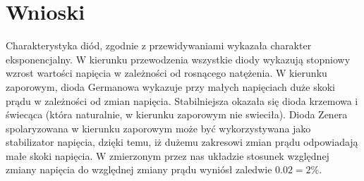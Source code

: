 \documentclass[11pt]{article}
\begin{document}
\section{Wnioski}
Charakterystyka diód, zgodnie z przewidywaniami wykazała charakter eksponencjalny. W kierunku przewodzenia wszystkie diody wykazują stopniowy wzrost wartości napięcia w zależności od rosnącego natężenia. W kierunku zaporowym, dioda Germanowa wykazuje przy małych napięciach duże skoki prądu w zależności od zmian napięcia. Stabilniejsza okazała się dioda krzemowa i świecąca (która naturalnie, w kierunku zaporowym nie swieciła).
Dioda Zenera spolaryzowana w kierunku zaporowym może być wykorzystywana jako stabilizator napięcia, dzięki temu, iż dużemu zakresowi zmian prądu odpowiadają małe skoki napięcia. W zmierzonym przez nas układzie stosunek względnej zmiany napięcia do względnej zmiany prądu wyniósł zaledwie $0.02 = 2\%$.
\end{document}
